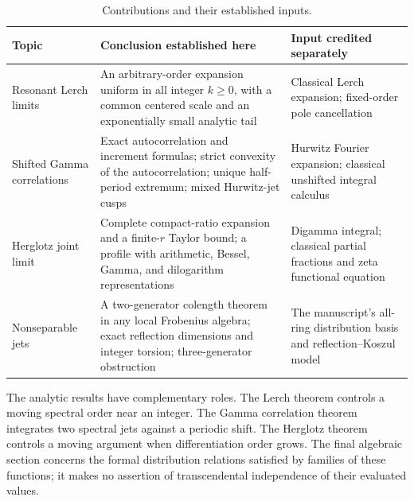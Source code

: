 \begin{table}[htbp]
\centering
\small
\caption{Contributions and their established inputs.}
\label{scope:contributions}
\medskip
\begin{tabular}{@{}>{\raggedright\arraybackslash}p{}>{\raggedright\arraybackslash}p{}>{\raggedright\arraybackslash}p{}@{}}
\toprule
Topic & Conclusion established here & Input credited separately\\
\midrule
Resonant Lerch limits & An arbitrary-order expansion uniform in all integer
$k\geq0$, with a common centered scale and an exponentially small analytic
tail & Classical Lerch expansion; fixed-order pole cancellation\\[5pt]
Shifted Gamma correlations & Exact autocorrelation and increment formulas;
strict convexity of the autocorrelation; unique half-period extremum;
mixed Hurwitz-jet cusps & Hurwitz Fourier expansion; classical unshifted
integral calculus\\[5pt]
Herglotz joint limit & Complete compact-ratio expansion and a finite-$r$
Taylor bound; a profile with arithmetic, Bessel, Gamma, and dilogarithm
representations & Digamma integral; classical partial fractions and zeta
functional equation\\[5pt]
Nonseparable jets & A two-generator colength theorem in any local
Frobenius algebra; exact reflection dimensions and integer torsion;
three-generator obstruction & The manuscript's all-ring distribution
basis and reflection--Koszul model\\
\bottomrule
\end{tabular}
\end{table}

The analytic results have complementary roles. The Lerch theorem controls a
moving spectral order near an integer. The Gamma correlation theorem
integrates two spectral jets against a periodic shift. The Herglotz theorem
controls a moving argument when differentiation order grows. The final
algebraic section concerns the formal distribution relations satisfied by
families of these functions; it makes no assertion of transcendental
independence of their evaluated values.

